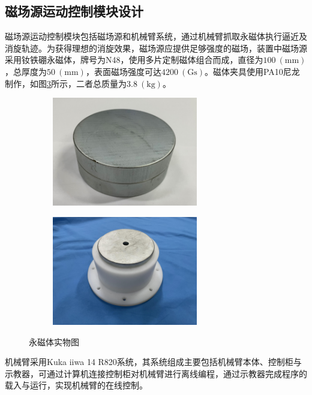 \documentclass[lang=chs, degree=master, blindreview=false, winfonts=true]{yanputhesis}
\begin{document}
\subsection{磁场源运动控制模块设计}
磁场源运动控制模块包括磁场源和机械臂系统，通过机械臂抓取永磁体执行逼近及消旋轨迹。为获得理想的消旋效果，磁场源应提供足够强度的磁场，装置中磁场源采用钕铁硼永磁体，牌号为N48，使用多片定制磁体组合而成，直径为$100\ (\mathrm{mm})$，总厚度为$50\ (\mathrm{mm})$，表面磁场强度可达$4200\ (\mathrm{Gs})$。磁体夹具使用PA10尼龙制作，如图\ref{Fig.sys_magnet}所示，二者总质量为$3.8\ (\mathrm{kg})$。
\begin{figure}[htbp]
	\centering
	\begin{minipage}[t]{0.96\textwidth}
		\begin{subfigure}[t]{0.47\textwidth}
			\centering
			\includegraphics[width = 2.5in]{picture/magnet.jpg}
			\caption{ }
			\label{fig:magnet}
		\end{subfigure}\hfill
		\begin{subfigure}[t]{0.47\textwidth}
			\centering
			\includegraphics[width = 2.5in]{picture/magnet_holder.jpg}
			\caption{ }
			\label{fig:magnet_holder}
		\end{subfigure}
	\end{minipage}
	\caption{永磁体实物图\label{Fig.sys_magnet}}
\end{figure}

机械臂采用Kuka iiwa 14 R820系统，其系统组成主要包括机械臂本体、控制柜与示教器，可通过计算机连接控制柜对机械臂进行离线编程，通过示教器完成程序的载入与运行，实现机械臂的在线控制。
\end{document}
